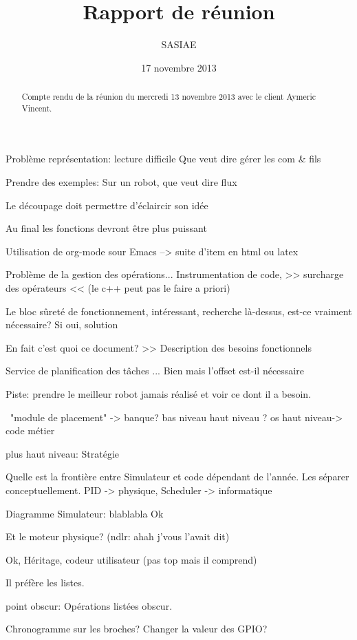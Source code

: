 \documentclass[a4paper,10pt]{article}
\title{Rapport de réunion}           %
\author{SASIAE}
\date{17 novembre 2013}
\begin{document}
\maketitle                    %

\begin{abstract}
Compte rendu de la réunion du mercredi 13 novembre 2013 avec le client Aymeric Vincent.
\end{abstract}
Problème représentation: lecture difficile
Que veut dire gérer les com & fils

Prendre des exemples:
Sur un robot, que veut dire flux

Le découpage doit permettre d'éclaircir son idée

Au final les fonctions devront être plus puissant

Utilisation de org-mode sour Emacs --> suite d'item en html ou latex

Problème de la gestion des opérations... Instrumentation de code, >> surcharge des opérateurs << (le c++ peut pas le faire a priori)

Le bloc sûreté de fonctionnement, intéressant, recherche là-dessus, est-ce vraiment nécessaire? Si oui, solution

En fait c'est quoi ce document?
>> Description des besoins fonctionnels

Service de planification des tâches ... Bien mais l'offset est-il nécessaire 

Piste: prendre le meilleur robot jamais réalisé et voir ce dont il a besoin.

~"module de placement" -> banque?
bas niveau
haut niveau
?
os
haut niveau-> code métier

plus haut niveau: Stratégie

Quelle est la frontière entre Simulateur et code dépendant de l'année. Les séparer conceptuellement. PID -> physique, Scheduler -> informatique

Diagramme Simulateur:
  blablabla Ok
  
Et le moteur physique? (ndlr: ahah j'vous l'avait dit)

Ok, Héritage, codeur utilisateur (pas top mais il comprend)

Il préfère les listes.

point obscur: Opérations listées obscur.

Chronogramme sur les broches? Changer la valeur des GPIO?
\end{document}
